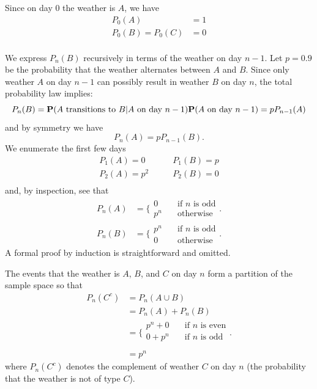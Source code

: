 \documentclass{homework}
\begin{document}
\begin{letterenum}
\item
Since on day 0 the weather is $A$, we have
\begin{align*}
    P_0(A) &= 1 \\
    P_0(B) = P_0(C) &= 0 \\
\end{align*}

We express $P_n(B)$ recursively in terms of the weather on day $n-1$. Let
$p=0.9$ be the probability that the weather alternates between $A$ and $B$. Since
only weather $A$ on day $n-1$ can possibly result in weather $B$ on day $n$, the
total probability law implies:
\begin{equation*}
    P_n(B) = {\bf P}(A \text{ transitions to } B | A \text{ on day } n - 1)
        {\bf P}(A \text{ on day } n-1) = p P_{n-1}(A)
\end{equation*}
and by symmetry we have
\begin{equation*}
    P_n(A) = p P_{n-1}(B).
\end{equation*}
We enumerate the first few days
\begin{align*}
    P_1(A) = 0 &\qquad P_1(B) = p \\
    P_2(A) = p^2 &\qquad P_2(B) = 0 \\
\end{align*}
and, by inspection, see that
\begin{align*}
    P_n(A) &= \biggl\{
        \begin{array}{ll}
            0 &\quad \text{if }n\text{ is odd} \\
            p^n &\quad \text{otherwise}
        \end{array}
    \biggr. \\
    P_n(B) &= \biggl\{
        \begin{array}{ll}
            p^n &\quad \text{if }n\text{ is odd} \\
            0 &\quad \text{otherwise}
        \end{array}
    \biggr.
\end{align*}
A formal proof by induction is straightforward and omitted.

\item The events that the weather is $A$, $B$, and $C$ on day $n$ form a 
partition of the sample space so that
\begin{align*}
    P_n(C^c) &= P_n(A \cup B) \\
        &= P_n(A) + P_n(B) \\
        &= \biggl\{
            \begin{array}{ll}
                p^n + 0 &\quad \text{if }n \text{ is even} \\
                0 + p^n &\quad \text{if }n \text{ is odd} \\
            \end{array}
        \biggr. \\
        &= p^n
\end{align*}
where $P_n(C^c)$ denotes the complement of weather $C$ on day $n$ (the probability that
the weather is not of type $C$).


\end{letterenum}
\end{document}
